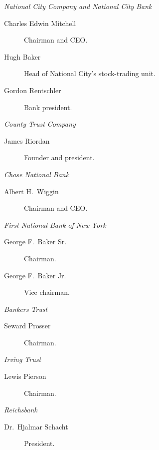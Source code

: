 \documentclass[11pt]{article}
\newcommand{\subcat}[1]{\par\medskip\noindent\textit{#1}\par\smallskip\noindent}
\begin{document}
\subcat{National City Company and National City Bank}
\begin{description}
\item[Charles Edwin Mitchell] Chairman and CEO.
\item[Hugh Baker] Head of National City's stock-trading unit.
\item[Gordon Rentschler] Bank president.
\end{description}

\subcat{County Trust Company}
\begin{description}
\item[James Riordan] Founder and president.
\end{description}

\subcat{Chase National Bank}
\begin{description}
\item[Albert H.\ Wiggin] Chairman and CEO.
\end{description}

\subcat{First National Bank of New York}
\begin{description}
\item[George F.\ Baker Sr.] Chairman.
\item[George F.\ Baker Jr.] Vice chairman.
\end{description}

\subcat{Bankers Trust}
\begin{description}
\item[Seward Prosser] Chairman.
\end{description}

\subcat{Irving Trust}
\begin{description}
\item[Lewis Pierson] Chairman.
\end{description}

\subcat{Reichsbank}
\begin{description}
\item[Dr.\ Hjalmar Schacht] President.
\end{description}
\end{document}
